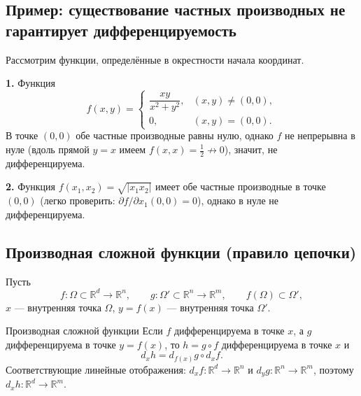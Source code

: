 \subsection{Пример: существование частных производных не гарантирует дифференцируемость}

\begin{Example}{}{}
	Рассмотрим функции, определённые в окрестности начала координат.
	
	\textbf{1.} Функция
	\[
	f(x,y)=
	\begin{cases}
		\dfrac{xy}{x^2+y^2}, & (x,y)\ne(0,0),\\
		0, & (x,y)=(0,0).
	\end{cases}
	\]
	В точке $(0,0)$ обе частные производные равны нулю, однако $f$ не непрерывна в нуле
	(вдоль прямой $y=x$ имеем $f(x,x)=\tfrac{1}{2}\not\to 0$), значит, не дифференцируема.
	
	\textbf{2.} Функция $f(x_1,x_2)=\sqrt{|x_1 x_2|}$ имеет обе частные производные в точке $(0,0)$
	(легко проверить: $\partial f/\partial x_1(0,0)=0$), однако в нуле не дифференцируема.
\end{Example}

\subsection{Производная сложной функции (правило цепочки)}

Пусть
\[
f\colon\Omega\subset\mathbb{R}^d\to\mathbb{R}^n,
\qquad
g\colon\Omega'\subset\mathbb{R}^n\to\mathbb{R}^m,
\qquad
f(\Omega)\subset\Omega',
\]
$x$ --- внутренняя точка $\Omega$, $y=f(x)$ --- внутренняя точка $\Omega'$.

\begin{Theorem}{Производная сложной функции}{}
	Если $f$ дифференцируема в точке $x$, а $g$ дифференцируема в точке $y=f(x)$, то
	$h=g\circ f$ дифференцируема в точке $x$ и
	\[
	d_x h = d_{f(x)}g\circ d_xf.
	\]
	Соответствующие линейные отображения: $d_xf\colon\mathbb{R}^d\to\mathbb{R}^n$ и
	$d_yg\colon\mathbb{R}^n\to\mathbb{R}^m$, поэтому $d_x h\colon\mathbb{R}^d\to\mathbb{R}^m$.
\end{Theorem}

